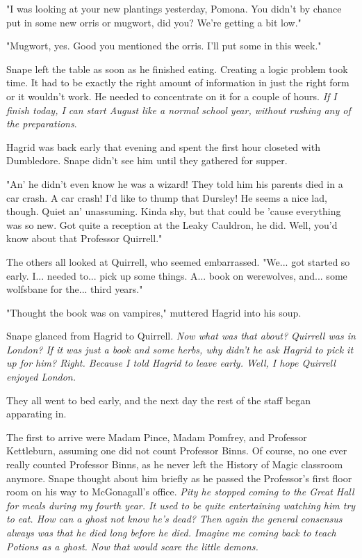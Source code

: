 "I was looking at your new plantings yesterday, Pomona. You didn't by chance put in some new orris or mugwort, did you? We're getting a bit low."

"Mugwort, yes. Good you mentioned the orris. I'll put some in this week."

Snape left the table as soon as he finished eating. Creating a logic problem took time. It had to be exactly the right amount of information in just the right form or it wouldn't work. He needed to concentrate on it for a couple of hours. \emph{If I finish today, I can start August like a normal school year, without rushing any of the preparations}.

Hagrid was back early that evening and spent the first hour closeted with Dumbledore. Snape didn't see him until they gathered for supper.

"An' he didn't even know he was a wizard! They told him his parents died in a car crash. A car crash! I'd like to thump that Dursley! He seems a nice lad, though. Quiet an' unassuming. Kinda shy, but that could be 'cause everything was so new. Got quite a reception at the Leaky Cauldron, he did. Well, you'd know about that Professor Quirrell."

The others all looked at Quirrell, who seemed embarrassed. "We... got started so early. I... needed to... pick up some things. A... book on werewolves, and... some wolfsbane for the... third years."

"Thought the book was on vampires," muttered Hagrid into his soup.

Snape glanced from Hagrid to Quirrell. \emph{Now what was that about? Quirrell was in London? If it was just a book and some herbs, why didn't he ask Hagrid to pick it up for him? Right. Because I told Hagrid to leave early. Well, I hope Quirrell enjoyed London.}

They all went to bed early, and the next day the rest of the staff began apparating in.

The first to arrive were Madam Pince, Madam Pomfrey, and Professor Kettleburn, assuming one did not count Professor Binns. Of course, no one ever really counted Professor Binns, as he never left the History of Magic classroom anymore. Snape thought about him briefly as he passed the Professor's first floor room on his way to McGonagall's office. \emph{Pity he stopped coming to the Great Hall for meals during my fourth year. It used to be quite entertaining watching him try to eat. How can a ghost not know he's dead? Then again the general consensus always was that he died long before he died. Imagine me coming back to teach Potions as a ghost. Now that would scare the little demons.}


